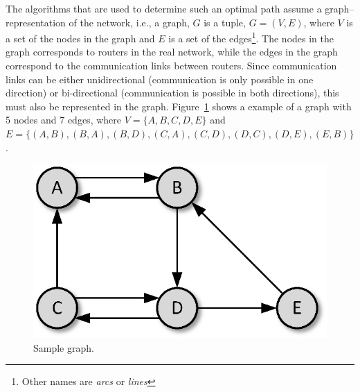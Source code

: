\documentclass[a4paper]{article}
\begin{document}
The algorithms that are used to determine such an optimal path assume a graph--representation of the network, i.e., a graph, $G$ is a tuple, $G = (V,E)$, where $V$ is a set of the nodes in the graph and $E$ is a set of the edges\footnote{Other names are \emph{arcs} or \emph{lines}}. The nodes in the graph corresponds to routers in the real network, while the edges in the graph correspond to the communication links between routers. Since communication links can be either unidirectional (communication is only possible in one direction) or bi-directional (communication is possible in both directions), this must also be represented in the graph.
Figure~\ref{fig:Graph1c} shows a example of a graph with 5 nodes and 7 edges, where $V=\{A,B,C,D,E\}$ and
$E=\{(A,B),(B,A),(B,D),(C,A),(C,D),(D,C),(D,E),(E,B)\}$.
\begin{figure}[ht]
\centering
\includegraphics[scale=0.8]{graph1c.eps}
\caption{\label{fig:Graph1c}Sample graph.}
\end{figure}
\end{document}

